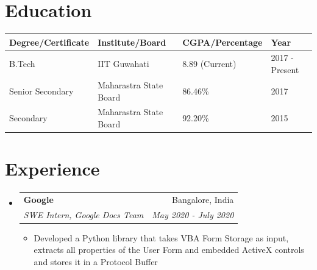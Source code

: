 \documentclass[a4paper,10pt]{report}
\makeatletter
\newcommand{\resumeSubheading}[4]{
    \vspace{-1pt}\item
        \begin{tabular*}{0.97\textwidth}[t]{l@{\extracolsep{\fill}}r}
          \textbf{#1} & #2 \\
          \textit{\small#3} & \textit{\small #4} \\
        \end{tabular*}\vspace{-6pt}
}
\newcommand{\resumeSubHeadingListStart}{\begin{itemize}[leftmargin=*]}
\newcommand{\resumeItemListEnd}{\end{itemize}\vspace{-5pt}}
\makeatother
\begin{document}
    \section{Education}
        \begin{center}
            \begin{tabu} to \linewidth { | X[c] | X[c] | X[c] | X[c] | } \hline
            \textbf{Degree/Certificate} & \textbf{Institute/Board} & \textbf{CGPA/Percentage} & \textbf{Year} \\\hline
            B.Tech & IIT Guwahati & 8.89 (Current) & 2017 - Present \\\hline
            Senior Secondary & Maharastra State Board & 86.46\% & 2017 \\\hline
            Secondary & Maharastra State Board & 92.20\% & 2015 \\\hline
            \end{tabu}
        \end{center}

\vspace{-7pt}
    \section{Experience}
        \resumeSubHeadingListStart
            \resumeSubheading
              {Google}{Bangalore, India}
              {SWE Intern, Google Docs Team}{May 2020 - July 2020}
                \begin{itemize}
                    \item Developed a Python library that takes VBA Form Storage as input, extracts all properties of the User Form and embedded ActiveX controls and stores it in a Protocol Buffer\\
                \end{itemize}
        \resumeItemListEnd


\vspace{-20pt}
\end{document}
